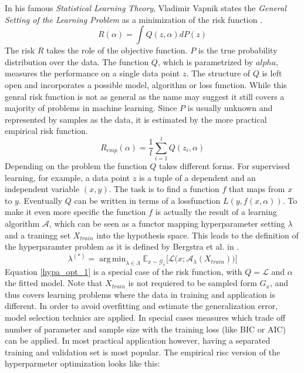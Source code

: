 \documentclass[english]{article}
\newcommand{\E}{\mathbb{E}}
\DeclareMathOperator*{\argmin}{arg\,min}
\begin{document}
In his famous \textit{Statistical Learning Theory}, Vladimir Vapnik states the \textit{General Setting of the Learning Problem} as a minimization of the risk function \cite{vapnik_overview_1999}.
\begin{equation}
R(\alpha) = \int Q(z,\alpha)dP(z)
\label{risk}
\end{equation}
The risk $R$ takes the role of the objective function. $P$ is the true probability distribution over the data. The function $Q$, which is parametrized by $alpha$, measures the performance on a single data point $z$. The structure of $Q$ is left open and incorporates a possible model, algorithm or loss function. While this genral risk function is not as general as the name may suggest it still covers a majority of problems in machine learning. Since $P$ is usually unknown and represented by samples as the data, it is estimated by the more practical empirical risk function.
\begin{equation}
R_{emp}(\alpha) = \frac{1}{l} \sum_{i=1}^l Q(z_i,\alpha)
\label{empirical risk}
\end{equation}
Depending on the problem the function $Q$ takes different forms. For supervised learning, for example, a data point $z$ is a tuple of a dependent and an independent variable $(x,y)$. The task is to find a function $f$ that maps from $x$ to $y$. Eventually $Q$ can be written in terms of a lossfunction $L(y,f(x,\alpha))$.
To make it even more specific the function $f$ is actually the result of a learning algorithm $\mathcal{A}$, which can be seen as a functor mapping hyperparameter setting $\lambda$ and a traningg set $X_{train}$ into the hypothesis space. This leads to the definition of the hyperparamter problem as it is defined by Bergstra et al. in \cite{bergstra_random_2012}.
\begin{equation}
\lambda^{(*)} = \argmin_{\lambda \in \Lambda} \E_{x \sim \mathcal{G}_x}\big[\mathcal{L}\big(x;\mathcal{A}_\lambda(X_{train})\big)\big]
\label{hypa_opt_1}
\end{equation}
Equation \ref{hypa_opt_1} is a special case of the risk function, with $Q = \mathcal{L}$ and $\alpha$ the fitted model. Note that $X_{train}$ is not requiered to be sampled form $G_x$, and thus covers learning problems where the data in training and application is different.
In order to avoid overfitting and estimate the generalization error, model selection technics are applied. In special cases measures which trade off number of parameter and sample size with the training loss (like BIC or AIC) can be applied. In most practical application however, having a separated training and validation set is most popular. The empirical risc version of the hyperparmeter optimization looks like this:
\end{document}
